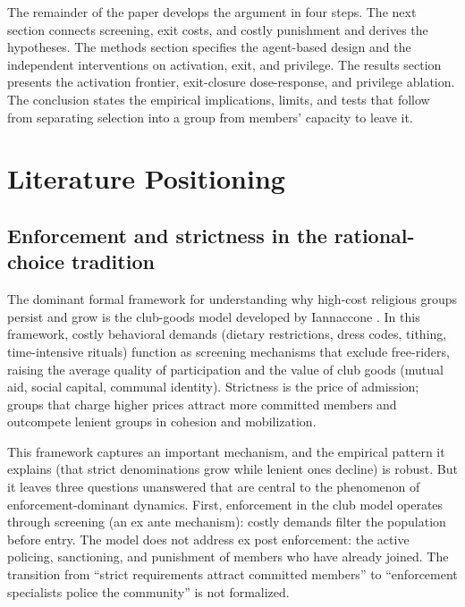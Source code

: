 \documentclass[12pt]{article}
\begin{document}
The remainder of the paper develops the argument in four steps. The next section connects screening, exit costs, and costly punishment and derives the hypotheses. The methods section specifies the agent-based design and the independent interventions on activation, exit, and privilege. The results section presents the activation frontier, exit-closure dose-response, and privilege ablation. The conclusion states the empirical implications, limits, and tests that follow from separating selection into a group from members' capacity to leave it.

\section{Literature Positioning}

\subsection{Enforcement and strictness in the rational-choice tradition}

The dominant formal framework for understanding why high-cost religious groups persist and grow is the club-goods model developed by Iannaccone \cite{iannaccone1992,iannaccone1994}. In this framework, costly behavioral demands (dietary restrictions, dress codes, tithing, time-intensive rituals) function as screening mechanisms that exclude free-riders, raising the average quality of participation and the value of club goods (mutual aid, social capital, communal identity). Strictness is the price of admission; groups that charge higher prices attract more committed members and outcompete lenient groups in cohesion and mobilization.

This framework captures an important mechanism, and the empirical pattern it explains (that strict denominations grow while lenient ones decline) is robust. But it leaves three questions unanswered that are central to the phenomenon of enforcement-dominant dynamics. First, enforcement in the club model operates through screening (an ex ante mechanism): costly demands filter the population before entry. The model does not address ex post enforcement: the active policing, sanctioning, and punishment of members who have already joined. The transition from ``strict requirements attract committed members'' to ``enforcement specialists police the community'' is not formalized.
\end{document}
